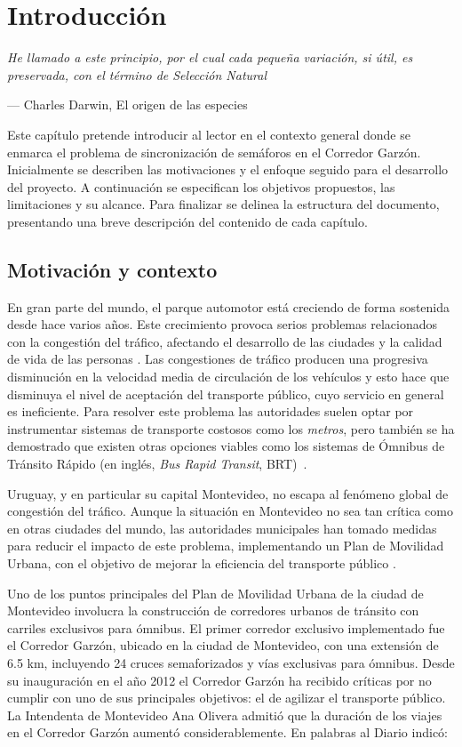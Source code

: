 \chapter{Introducción}
\epigraph{ \textit{He llamado a este principio, por el cual cada pequeña variación, si útil, es preservada, con el término de Selección Natural}}{--- Charles Darwin, El origen de las especies}

Este capítulo pretende introducir al lector en el contexto general donde se enmarca el problema de sincronización de semáforos en el Corredor Garzón. Inicialmente se describen las motivaciones y el enfoque seguido para el desarrollo del proyecto. A continuación se especifican los objetivos propuestos, las limitaciones y su alcance. Para finalizar se delinea la estructura del documento, presentando una breve descripción del contenido de cada capítulo. 

\section{Motivación y contexto}

En gran parte del mundo, el parque automotor está creciendo de forma sostenida desde hace varios años. Este crecimiento provoca serios problemas relacionados con la congestión del tráfico, afectando el desarrollo de las ciudades y la calidad de vida de las personas \citep{Cepal2003}. Las congestiones de tráfico producen una progresiva disminución en la velocidad media de circulación de los vehículos y esto hace que disminuya el nivel de aceptación del transporte público, cuyo servicio en general es ineficiente. Para resolver este problema las autoridades suelen optar por instrumentar sistemas de transporte costosos como los \emph{metros}, pero también se ha demostrado que existen otras opciones viables como los sistemas de Ómnibus de Tránsito Rápido (en inglés, \textit{Bus Rapid Transit}, BRT)~\citep{BRT_Dial}.

Uruguay, y en particular su capital Montevideo, no escapa al fenómeno global de congestión del tráfico. Aunque la situación en Montevideo no sea tan crítica como en otras ciudades del mundo, las autoridades municipales han tomado medidas para reducir el impacto de este problema, implementando un Plan de Movilidad Urbana, con el objetivo de mejorar la eficiencia del transporte público \citep{PlanMovilidad}.

Uno de los puntos principales del Plan de Movilidad Urbana de la ciudad de Montevideo involucra la construcción de corredores urbanos de tránsito con carriles exclusivos para ómnibus. El primer corredor exclusivo implementado fue el Corredor Garzón, ubicado en la ciudad de Montevideo, con una extensión de 6.5 km, incluyendo 24 cruces semaforizados y vías exclusivas para ómnibus. Desde su inauguración en el año 2012 el Corredor Garzón ha recibido críticas por no cumplir con uno de sus principales objetivos: el de agilizar el transporte público. La Intendenta de Montevideo Ana Olivera admitió que la duración de los viajes en el Corredor Garzón aumentó considerablemente. En palabras al Diario \cite{olivera2015} indicó: 



